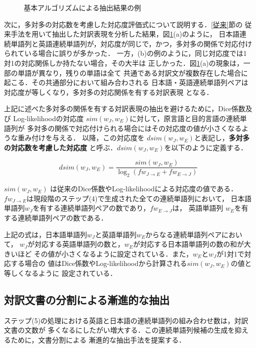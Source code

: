 \begin{figure}[t]
  \begin{center}
    \epsfxsize=9cm 
  \end{center}
  \caption{基本アルゴリズムによる抽出結果の例}
  \label{抽出結果の例}
\end{figure}

\noindent
次に，多対多の対応数を考慮した対応度評価式について説明する．\ref{従来}節の
従来手法を用いて抽出した対訳表現を分析した結果，図\ref{抽出結果の例}(a)のように，
日本語連続単語列と英語連続単語列が，対応度が同じで，かつ，多対多の関係で対応付け
られている場合に誤りが多かった．
一方，(b)の例のように，同じ対応度では1対1の対応関係しか持たない場合，その大半は
正しかった．図\ref{抽出結果の例}(a)の現象は，一部の単語が異なり，残りの単語は全て
共通である対訳文が複数存在した場合に起こる．その共通部分において組み合わされる
日本語・英語連続単語列ペアは対応度が等しくなり，多対多の対応関係を有する対訳表現
となる．

上記に述べた多対多の関係を有する対訳表現の抽出を避けるために，Dice係数及び
Log-likelihoodの対応度 $sim(w_{J},w_{E})$に対して，原言語と目的言語の連続単語列が
多対多の関係で対応付けられる場合にはその対応度の値が小さくなるような重み付けを与える．
以降，この対応度を $dsim(w_{J},w_{E})$と表記し，{\bf 多対多の対応数を考慮した対応度}
と呼ぶ．$dsim(w_{J},w_{E})$を以下のように定義する．

\[ dsim(w_{J},w_{E})= \frac{sim(w_{J},w_{E})}{\log_{2}(fw_{J \rightarrow E}+fw_{E \rightarrow J})} \]

$sim(w_{J},w_{E})$ は従来のDice係数やLog-likelihoodによる対応度の値である．
$fw_{J \rightarrow E}$は現段階のステップ(4)で生成された全ての連続単語列において，
日本語単語列$w_{J}$を有する連続単語列ペアの数であり，$fw_{E \rightarrow J}$は，
英語単語列 $w_{E}$を有する連続単語列ペアの数である．

上記の式は，日本語単語列$w_{J}$と英語単語列$w_{E}$からなる連続単語列ペアにおいて，
$w_{J}$が対応する英語単語列の数と，$w_{E}$が対応する日本語単語列の数の和が大きいほど
その値が小さくなるように設定されている．また，$w_{E}$と$w_{J}$が1対1で対応する場合の
値はDice係数やLog-likelihoodから計算される$sim(w_{J},w_{E})$の値と等しくなるように
設定されている．

\subsection{対訳文書の分割による漸進的な抽出}

ステップ(5)の処理における英語と日本語の連続単語列の組み合わせ数は，対訳文書の文数が
多くなるにしたがい増大する．この連続単語列候補の生成を抑えるために，文書分割による
漸進的な抽出手法を提案する．

